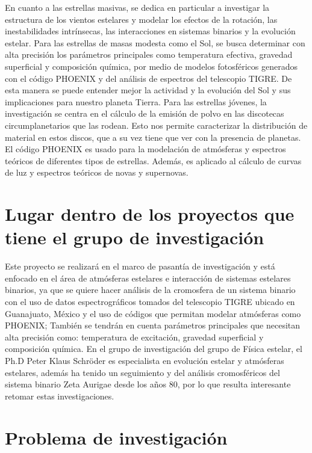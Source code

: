 \documentclass[11pt]{article}
\begin{document}
\noindent  En cuanto a las estrellas masivas, se dedica en particular a investigar la estructura de los vientos estelares y modelar los efectos de la rotación, las inestabilidades intrínsecas, las interacciones en sistemas binarios y la evolución estelar. Para las estrellas de masas modesta como el Sol, se busca determinar con alta precisión los parámetros principales como temperatura efectiva, gravedad superficial y composición química, por medio de modelos fotosféricos generados con el código PHOENIX y del análisis de espectros del telescopio TIGRE. De esta manera se puede entender mejor la actividad y la evolución del Sol y sus implicaciones para nuestro planeta Tierra. Para las estrellas jóvenes, la investigación se centra en el cálculo de la emisión de polvo en las discotecas circumplanetarios que las rodean. Esto nos permite caracterizar la distribución de material en estos discos, que a su vez tiene que ver con la presencia de planetas. El código PHOENIX es usado para la modelación de atmósferas y espectros teóricos de diferentes tipos de estrellas. Además, es aplicado al cálculo de curvas de luz y espectros teóricos de novas y supernovas.

\section{Lugar dentro de los proyectos que tiene el grupo de investigación}
\noindent Este proyecto se realizará en el marco de pasantía de investigación y está enfocado en el área de atmósferas estelares e interacción de sistemas estelares binarios, ya que se quiere hacer análisis de la cromosfera de un sistema binario con el uso de datos espectrográficos tomados del telescopio TIGRE ubicado en Guanajuato, México y el uso de códigos que permitan modelar atmósferas como PHOENIX; También se tendrán en cuenta parámetros principales que necesitan alta precisión como: temperatura de excitación, gravedad superficial y composición química. En el grupo de investigación del grupo de Física estelar, el Ph.D Peter Klaus Schröder es especialista en evolución estelar y atmósferas estelares, además ha tenido un seguimiento y del análisis cromosféricos del sistema binario Zeta Aurigae desde los años 80, por lo que resulta interesante retomar estas investigaciones.

\section{Problema de investigación}
\end{document}
